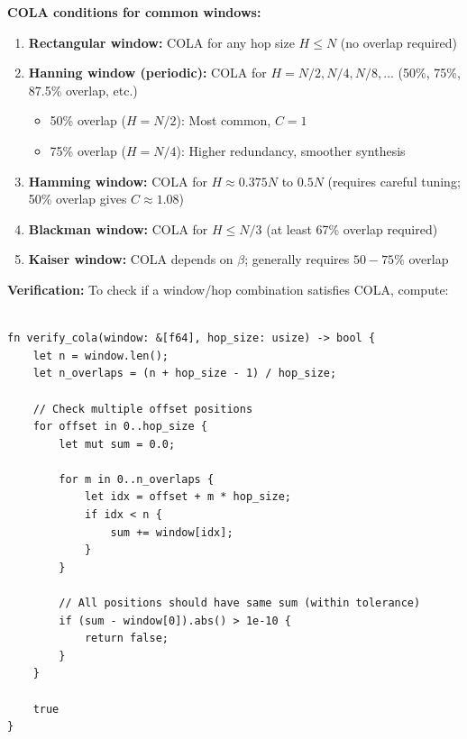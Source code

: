 \textbf{COLA conditions for common windows:}

\begin{enumerate}[itemsep=3pt]
  \item \textbf{Rectangular window:} COLA for any hop size $H \leq N$
    (no overlap required)

  \item \textbf{Hanning window (periodic):} COLA for $H = N/2, N/4,
    N/8, \ldots$ (50\%, 75\%, 87.5\% overlap, etc.)
    \begin{itemize}
      \item 50\% overlap ($H = N/2$): Most common, $C = 1$
      \item 75\% overlap ($H = N/4$): Higher redundancy, smoother synthesis
    \end{itemize}

  \item \textbf{Hamming window:} COLA for $H \approx 0.375N$ to
    $0.5N$ (requires careful tuning; 50\% overlap gives $C \approx 1.08$)

  \item \textbf{Blackman window:} COLA for $H \leq N/3$ (at least
    67\% overlap required)

  \item \textbf{Kaiser window:} COLA depends on $\beta$; generally
    requires $50-75\%$ overlap
\end{enumerate}

\textbf{Verification:} To check if a window/hop combination satisfies
COLA, compute:

\begin{lstlisting}[caption={Verifying COLA constraint for window and hop}]

fn verify_cola(window: &[f64], hop_size: usize) -> bool {
    let n = window.len();
    let n_overlaps = (n + hop_size - 1) / hop_size;

    // Check multiple offset positions
    for offset in 0..hop_size {
        let mut sum = 0.0;

        for m in 0..n_overlaps {
            let idx = offset + m * hop_size;
            if idx < n {
                sum += window[idx];
            }
        }

        // All positions should have same sum (within tolerance)
        if (sum - window[0]).abs() > 1e-10 {
            return false;
        }
    }

    true
}
\end{lstlisting}

